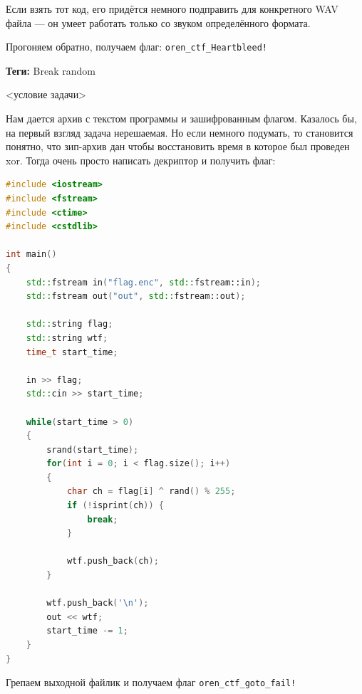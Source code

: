 \documentclass[idxtotoc,hyperref,openany,oneside]{files/forensics} %
\begin{document}
Если взять тот код, его придётся немного подправить для конкретного WAV файла — он умеет работать только со звуком определённого формата.

Прогоняем обратно, получаем флаг: \verb|oren_ctf_Heartbleed!|




\textbf{Теги:} Break random\vspace{\baselineskip}

\begin{tcolorbox}
<условие задачи>
\end{tcolorbox}

Нам дается архив с текстом программы и зашифрованным флагом. Казалось бы, на первый взгляд задача нерешаемая. Но если немного подумать, то становится понятно, что зип-архив дан чтобы восстановить время в которое был проведен xor. Тогда очень просто написать декриптор и получить флаг:
\begin{lstlisting}[language=C++,
					directivestyle={\color{black}}
					emph={int,char,double,float,unsigned},
					emphstyle={\color{blue}}
					]
#include <iostream>
#include <fstream>
#include <ctime>
#include <cstdlib>

int main()
{
    std::fstream in("flag.enc", std::fstream::in);
    std::fstream out("out", std::fstream::out);

 	std::string flag;
 	std::string wtf;
 	time_t start_time;

    in >> flag;
    std::cin >> start_time;

 	while(start_time > 0)
 	{
  		srand(start_time);
  		for(int i = 0; i < flag.size(); i++)
 	 	{
            char ch = flag[i] ^ rand() % 255;
            if (!isprint(ch)) {
                break;
            }
    		
            wtf.push_back(ch);
  		} 
  	
        wtf.push_back('\n');
		out << wtf;
  		start_time -= 1;
 	} 
}	
\end{lstlisting}
				   
Грепаем выходной файлик и получаем флаг \verb|oren_ctf_goto_fail!|



\end{document}
